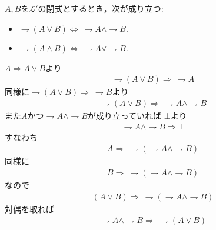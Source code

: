 	\begin{screen}
		\begin{metathm}[De Morganの法則]
			$A,B$を$\mathcal{L}'$の閉式とするとき，次が成り立つ:
			\begin{itemize}
				\item $\rightharpoondown (A \vee B) \Longleftrightarrow\ \rightharpoondown A \wedge \rightharpoondown B$.
			
				\item $\rightharpoondown (A \wedge B) \Longleftrightarrow\ \rightharpoondown A \vee \rightharpoondown B$.
			\end{itemize}
		\end{metathm}
	\end{screen}
	
	\begin{prf}
		$A \Longrightarrow A \vee B$より
		\begin{align}
			\rightharpoondown (A \vee B) \Longrightarrow\ \rightharpoondown A
		\end{align}
		同様に$\rightharpoondown (A \vee B) \Longrightarrow\ \rightharpoondown B$より
		\begin{align}
			\rightharpoondown (A \vee B) \Longrightarrow\ \rightharpoondown A \wedge \rightharpoondown B
		\end{align}
		また$A$かつ$\rightharpoondown A \wedge \rightharpoondown B$が成り立っていれば
		$\bot$より
		\begin{align}
			\rightharpoondown A \wedge \rightharpoondown B \Longrightarrow \bot
		\end{align}
		すなわち
		\begin{align}
			A \Longrightarrow\ \rightharpoondown(\rightharpoondown A \wedge \rightharpoondown B)
		\end{align}
		同様に
		\begin{align}
			B \Longrightarrow\ \rightharpoondown(\rightharpoondown A \wedge \rightharpoondown B)
		\end{align}
		なので
		\begin{align}
			(A \vee B) \Longrightarrow\ \rightharpoondown(\rightharpoondown A \wedge \rightharpoondown B)
		\end{align}
		対偶を取れば
		\begin{align}
			\rightharpoondown A \wedge \rightharpoondown B
			\Longrightarrow\ \rightharpoondown (A \vee B)
		\end{align}
	\end{prf}
	
	
